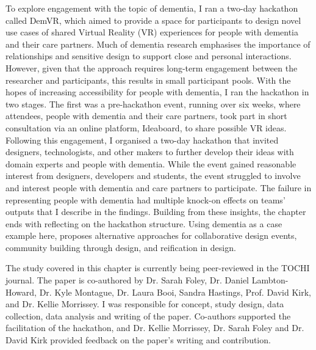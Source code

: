 To explore engagement with the topic of dementia, I ran a two-day hackathon called DemVR, which aimed to provide a space for participants to design novel use cases of shared Virtual Reality (VR) experiences for people with dementia and their care partners. Much of dementia research emphasises the importance of relationships and sensitive design to support close and personal interactions. However, given that the approach requires long-term engagement between the researcher and participants, this results in small participant pools. With the hopes of increasing accessibility for people with dementia, I ran the hackathon in two stages. The first was a pre-hackathon event, running over six weeks, where attendees, people with dementia and their care partners, took part in short consultation via an online platform, Ideaboard, to share possible VR ideas. Following this engagement, I organised a two-day hackathon that invited designers, technologists, and other makers to further develop their ideas with domain experts and people with dementia. While the event gained reasonable interest from designers, developers and students, the event struggled to involve and interest people with dementia and care partners to participate. The failure in representing people with dementia had multiple knock-on effects on teams' outputs that I describe in the findings. Building from these insights, the chapter ends with reflecting on the hackathon structure. Using dementia as a case example here, proposes alternative approaches for collaborative design events, community building through design, and reification in design.

The study covered in this chapter is currently being peer-reviewed in the TOCHI journal. The paper is co-authored by Dr. Sarah Foley, Dr. Daniel Lambton-Howard, Dr. Kyle Montague, Dr. Laura Booi, Sandra Hastings, Prof. David Kirk, and Dr. Kellie Morrissey. I was responsible for concept, study design, data collection, data analysis and writing of the paper. Co-authors supported the facilitation of the hackathon, and Dr. Kellie Morrissey, Dr. Sarah Foley and Dr. David Kirk provided feedback on the paper's writing and contribution.


